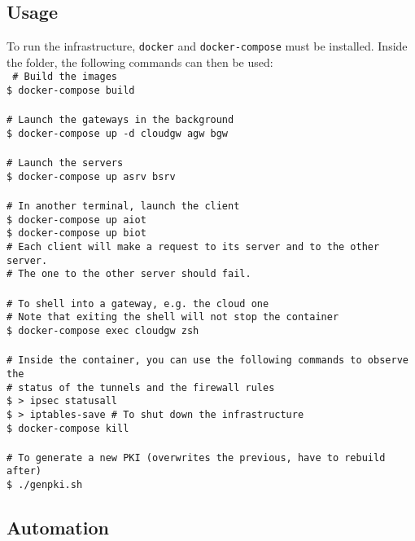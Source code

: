 \documentclass[paper=a4, fontsize=11pt]{scrartcl}
\begin{document}
\subsection{Usage}

To run the infrastructure, \texttt{docker} and \texttt{docker-compose} must be
installed.
Inside the folder, the following commands can then be used:\\
\texttt{%
    \# Build the images \\
    \$ docker-compose build
    \\ \\
    \# Launch the gateways in the background \\
    \$ docker-compose up -d cloudgw agw bgw
    \\ \\
    \# Launch the servers \\
    \$ docker-compose up asrv bsrv
    \\ \\
    \# In another terminal, launch the client \\
    \$ docker-compose up aiot \\
    \$ docker-compose up biot \\
    \# Each client will make a request to its server and to the other server.\\
    \# The one to the other server should fail.
    \\ \\
    \# To shell into a gateway, e.g.\ the cloud one \\
    \# Note that exiting the shell will not stop the container \\
    \$ docker-compose exec cloudgw zsh
    \\ \\
    \# Inside the container, you can use the following commands to observe the \\
    \# status of the tunnels and the firewall rules \\
    \$ > ipsec statusall \\
    \$ > iptables-save
    \# To shut down the infrastructure \\
    \$ docker-compose kill
    \\ \\
    \# To generate a new PKI (overwrites the previous, have to rebuild after) \\
    \$~./genpki.sh
}

\subsection{Automation}
\end{document}
